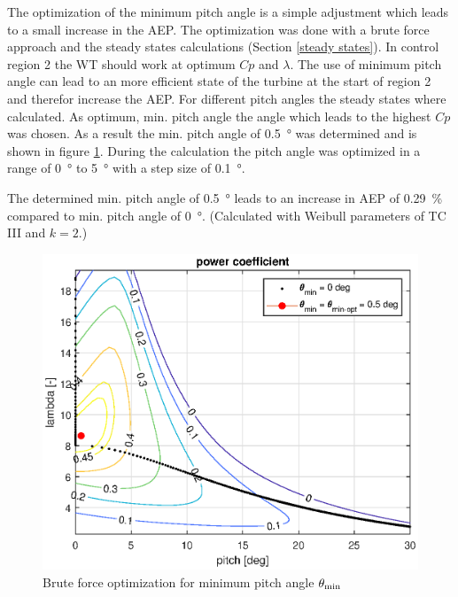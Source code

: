 The optimization of the minimum pitch angle is a simple adjustment which leads to a small increase in the AEP. 
The optimization was done with a brute force approach and the steady states calculations (Section \ref{steady states}). 
In control region 2 the WT should work at optimum $Cp$ and $\lambda$. 
The use of minimum pitch angle can lead to an more efficient state of the turbine at the start of region 2 and therefor increase the AEP. 
For different pitch angles the steady states where calculated. 
As optimum, min. pitch angle the angle which leads to the highest $Cp$ was chosen. 
As a result the min. pitch angle of \SI{0.5}{\degree} was determined and is shown in figure \ref{fig:theta min general}. 
During the calculation the pitch angle was optimized in a range of \SI{0}{\degree} to \SI{5}{\degree} with a step size of \SI{0.1}{\degree}.

The determined min. pitch angle of \SI{0.5}{\degree} leads to an increase in AEP of \SI{0.29}{\%} compared to min. pitch angle of \SI{0}{\degree}. 
(Calculated with Weibull parameters of TC III and $k=2$.)

\begin{figure}[tbh]
	\centering	
	\includegraphics[width=12cm]{Figures/ThetaMinOpt}
	\caption{Brute force optimization for minimum pitch angle $\theta_\textnormal{min}$}
	\label{fig:theta min general}
\end{figure}